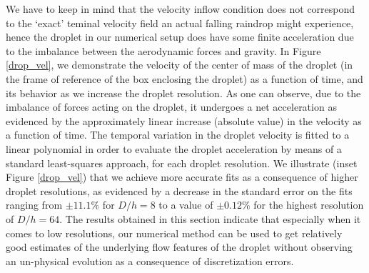 We have to keep in mind that the velocity inflow condition 
does not correspond to the `exact' teminal velocity 
field an actual falling raindrop might experience, 
hence the droplet in our numerical setup does have some 
finite acceleration due to the imbalance 
between the aerodynamic forces and gravity. 
In Figure \ref{drop_vel}, we demonstrate the velocity of 
the center of mass of the droplet (in the frame of reference 
of the box enclosing the droplet) as a function of time, 
and its behavior as we increase the droplet resolution. 
As one can observe, due to the imbalance of forces acting on the droplet, 
it undergoes a net acceleration as evidenced by the approximately 
linear increase (absolute value) in the velocity as a function of time. 
The temporal variation in the droplet velocity is fitted to a 
linear polynomial in order to evaluate the droplet acceleration 
by means of a standard least-squares approach, for each droplet resolution. 
We illustrate (inset Figure \ref{drop_vel}) that we achieve more 
accurate fits as a consequence of higher droplet resolutions, 
as evidenced by a decrease in the standard error on the fits 
ranging from $\pm 11.1 \%$ for $D/h = 8$ to a value of $\pm 0.12 \%$ 
for the highest resolution of $D/h = 64$. 
The results obtained in this section indicate that especially 
when it comes to low resolutions, 
our numerical method can be used to get relatively good 
estimates of the underlying flow features of the droplet 
without observing an un-physical evolution as a consequence of discretization errors.           


